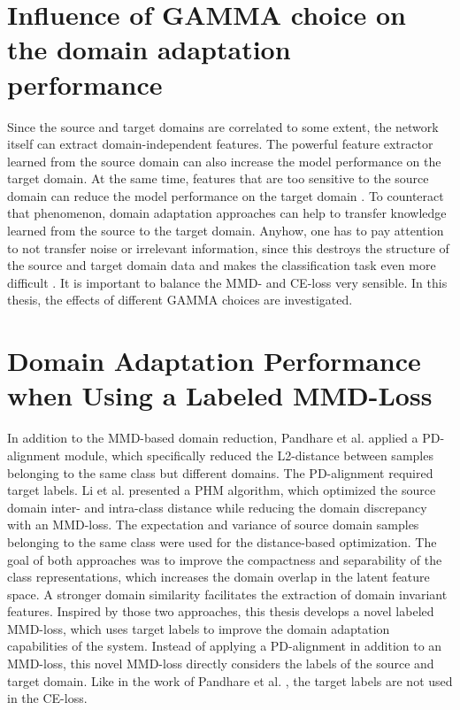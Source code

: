 \section{Influence of GAMMA choice on the domain adaptation performance}
Since the source and target domains are correlated to some extent, the network itself can extract domain-independent features. The powerful feature extractor learned from the source domain can also increase the model performance on the target domain. At the same time, features that are too sensitive to the source domain can reduce the model performance on the target domain \cite{li2020}. To counteract that phenomenon, domain adaptation approaches can help to transfer knowledge learned from the source to the target domain. Anyhow, one has to pay attention to not transfer noise or irrelevant information, since this destroys the structure of the source and target domain data and makes the classification task even more difficult \cite{li2020}. It is important to balance the MMD- and CE-loss very sensible. In this thesis, the effects of different GAMMA choices are investigated.

\section{Domain Adaptation Performance when Using a Labeled MMD-Loss}
In addition to the MMD-based domain reduction, Pandhare et al. \cite{Pandhare2021} applied a PD-alignment module, which specifically reduced the L2-distance between samples belonging to the same class but different domains. The PD-alignment required target labels. Li et al. \cite{Li2018} presented a PHM algorithm, which optimized the source domain inter- and intra-class distance while reducing the domain discrepancy with an MMD-loss. The expectation and variance of source domain samples belonging to the same class were used for the distance-based optimization. The goal of both approaches was to improve the compactness and separability of the class representations, which increases the domain overlap in the latent feature space. A stronger domain similarity facilitates the extraction of domain invariant features. Inspired by those two approaches, this thesis develops a novel labeled MMD-loss, which uses target labels to improve the domain adaptation capabilities of the system. Instead of applying a PD-alignment in addition to an MMD-loss, this novel MMD-loss directly considers the labels of the source and target domain. Like in the work of Pandhare et al. \cite{Pandhare2021}, the target labels are not used in the CE-loss.

